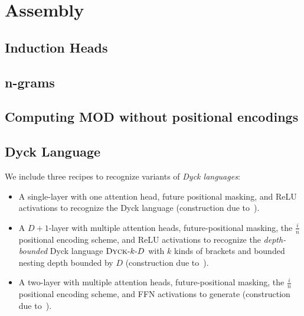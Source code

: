 %
\chapter{Assembly}
%



\section{Induction Heads}


\section{n-grams}


\section{Computing MOD without positional encodings}


\section{Dyck Language}
We include three recipes to recognize variants of \textit{Dyck languages}:\begin{itemize}
    \item A single-layer \SMAT{} with one attention head, future positional masking, and ReLU activations to recognize the Dyck language  (construction due to~\citet{bhattamishra2020ability}).
    \item A $D{+}1$-layer \UHAT{} with multiple attention heads, future-positional masking, the $\frac{i}{n}$ positional encoding scheme, and ReLU activations to recognize the \textit{depth-bounded} Dyck language $\textsc{Dyck}\text{-}k\text{-}D$ with $k$ kinds of brackets and bounded nesting depth bounded by $D$ (construction due to~\citet{yao-2021-self-attention}).
    \item A two-layer with multiple attention heads, future-positional masking, the $\frac{i}{n}$ positional encoding scheme, and FFN activations to generate  (construction due to~\citet{yao-2021-self-attention}).
    
\end{itemize}

